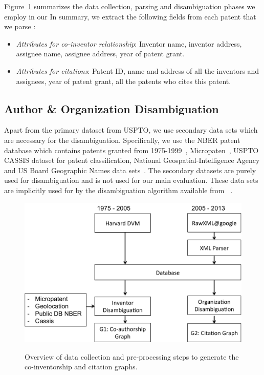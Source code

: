 Figure~\ref{process} summarizes the data collection, parsing and disambiguation phases we employ in our 
In summary, we extract the following fields from each patent that we parse :

\begin{itemize}
\squish
\item {\em Attributes for co-inventor relationship}:
Inventor name, inventor address, assignee name, assignee address, year of patent grant.

\item {\em Attributes for citations}:
Patent ID, name and address of all the inventors and assignees, year of patent grant, all the patents who cites this patent.
\end{itemize}


\subsection{Author \& Organization Disambiguation}

Apart from the primary dataset from USPTO, we use secondary data sets which are necessary for the disambiguation. Specifically, we use the NBER patent database which contains patents granted from 1975-1999~\cite{NBER}, Micropaten~\cite{micropatent}, USPTO CASSIS dataset for patent classification, National Geospatial-Intelligence Agency and US Board Geographic Names data sets~\cite{geocoding, geotable}. The secondary datasets are purely used for disambiguation and is not used for our main evaluation. These data sets are implicitly used for by the disambiguation algorithm available from ~\cite{disambiguation}.

\begin{figure}[H]
		  \centering	
          \includegraphics[scale=0.5]{../figures/process.pdf}
          \label{process}
          \caption{Overview of data collection and pre-processing steps to generate the co-inventorship and citation graphs.}
\end{figure}


